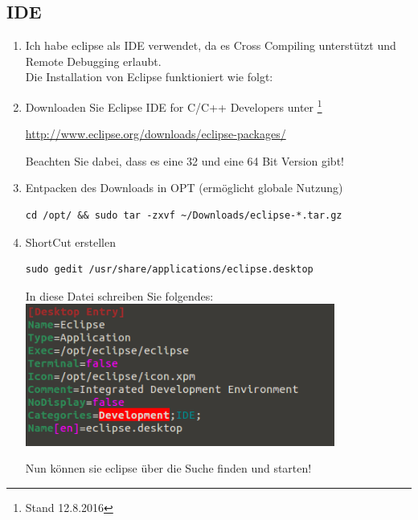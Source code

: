 \documentclass{article}
\begin{document}
\subsection{IDE}
\begin{enumerate}

\item[]Ich habe eclipse als IDE verwendet, da es Cross Compiling unterstützt und Remote Debugging erlaubt.\\
Die Installation von Eclipse funktioniert wie folgt:\\
\item Downloaden Sie Eclipse IDE for C/C++ Developers unter  \footnote{Stand 12.8.2016}\\ 

\begin{center}

\url{http://www.eclipse.org/downloads/eclipse-packages/}\\ 

\end{center}

Beachten Sie dabei, dass es eine 32 und eine 64 Bit Version gibt!\\

\item Entpacken des Downloads in OPT (ermöglicht globale Nutzung)
\begin{verbatim}
cd /opt/ && sudo tar -zxvf ~/Downloads/eclipse-*.tar.gz
\end{verbatim}

\item ShortCut erstellen
\begin{verbatim}
sudo gedit /usr/share/applications/eclipse.desktop
\end{verbatim}

In diese Datei schreiben Sie folgendes:\\

\includegraphics[width=0.8\textwidth]{graphics/eclipse.png}

Nun können sie eclipse über die Suche finden und starten!\\
\end{enumerate}
\end{document}
